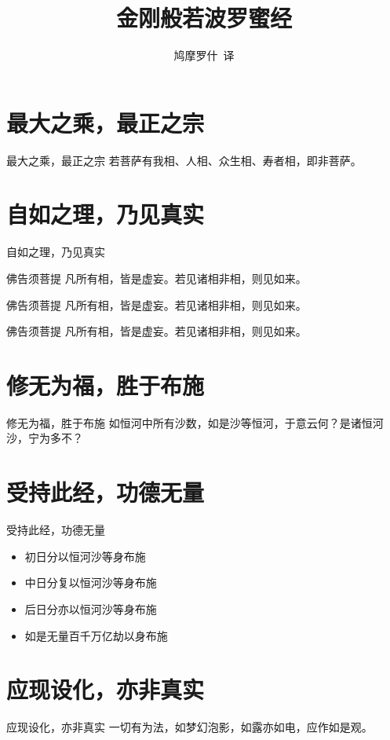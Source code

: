 \documentclass{beamer}
\begin{document}
\begin{frame}
\title{金刚般若波罗蜜经}
\author{鸠摩罗什\ 译}
\date{}
\maketitle
\end{frame}

\frame{\tableofcontents}

\section{最大之乘，最正之宗}
\begin{frame}{最大之乘，最正之宗}
若菩萨有我相、人相、众生相、寿者相，即非菩萨。
\end{frame}

\section{自如之理，乃见真实}
\begin{frame}{自如之理，乃见真实}
\begin{block}{佛告须菩提}
凡所有相，皆是虚妄。若见诸相非相，则见如来。
\end{block}
\begin{alertblock}{佛告须菩提}
凡所有相，皆是虚妄。若见诸相非相，则见如来。
\end{alertblock}
\begin{exampleblock}{佛告须菩提}
凡所有相，皆是虚妄。若见诸相非相，则见如来。
\end{exampleblock}
\end{frame}

\section{修无为福，胜于布施}
\frame{\tableofcontents[currentsection]}
\begin{frame}{修无为福，胜于布施}
如恒河中所有沙数，如是沙等恒河，于意云何？是诸恒河沙，宁为多不？
\end{frame}

\section{受持此经，功德无量}
\begin{frame}{受持此经，功德无量}
\begin{itemize}
    \item 初日分以恒河沙等身布施
    \pause
    \item 中日分复以恒河沙等身布施
    \pause
    \item 后日分亦以恒河沙等身布施
    \pause
    \item 如是无量百千万亿劫以身布施
\end{itemize}
\end{frame}

\section{应现设化，亦非真实}
\begin{frame}{应现设化，亦非真实}
\transdissolve
一切有为法，如梦幻泡影，如露亦如电，应作如是观。
\end{frame}
\end{document}
